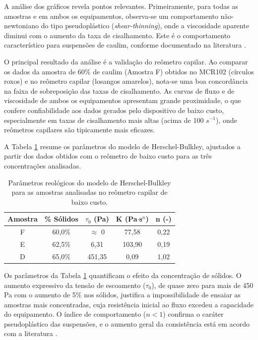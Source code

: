 \documentclass[article,12pt,oneside,a4paper,english,brazil,sumario=tradicional]{abntex2}
\begin{document}
A análise dos gráficos revela pontos relevantes. Primeiramente, para todas as amostras e em ambos os equipamentos, observa-se um comportamento não-newtoniano do tipo pseudoplástico (\textit{shear-thinning}), onde a viscosidade aparente diminui com o aumento da taxa de cisalhamento. Este é o comportamento característico para suspensões de caulim, conforme documentado na literatura .

O principal resultado da análise é a validação do reômetro capilar. Ao comparar os dados da amostra de 60\% de caulim (Amostra F) obtidos no MCR102 (círculos roxos) e no reômetro capilar (losangos amarelos), nota-se uma boa concordância na faixa de sobreposição das taxas de cisalhamento. As curvas de fluxo e de viscosidade de ambos os equipamentos apresentam grande proximidade, o que confere confiabilidade aos dados gerados pelo dispositivo de baixo custo, especialmente em taxas de cisalhamento mais altas (acima de 100 $s^{-1}$), onde reômetros capilares são tipicamente mais eficazes.

A Tabela \ref{tab:parametros_reologicos} resume os parâmetros do modelo de Herschel-Bulkley, ajustados a partir dos dados obtidos com o reômetro de baixo custo para as três concentrações analisadas.

\begin{table}[h!]
\centering
\caption{Parâmetros reológicos do modelo de Herschel-Bulkley para as amostras analisadas no reômetro capilar de baixo custo.}
\label{tab:parametros_reologicos}
\begin{tabular}{@{}ccccc@{}}
\toprule
\textbf{Amostra} & \textbf{\% Sólidos} & \textbf{$\tau_0$ (Pa)} & \textbf{K (Pa$\cdot$s$^n$)} & \textbf{n (-)} \\ \midrule
F & 60,0\% & $\approx$ 0 & 77,58 & 0,22 \\
E & 62,5\% & 6,31 & 103,90 & 0,19 \\
D & 65,0\% & 451,35 & 0,09 & 1,02 \\ \bottomrule
\end{tabular}
\end{table}

Os parâmetros da Tabela \ref{tab:parametros_reologicos} quantificam o efeito da concentração de sólidos. O aumento expressivo da tensão de escoamento ($\tau_0$), de quase zero para mais de 450 Pa com o aumento de 5\% nos sólidos, justifica a impossibilidade de ensaiar as amostras mais concentradas, cuja resistência inicial ao fluxo excedeu a capacidade do equipamento. O índice de comportamento ($n<1$) confirma o caráter pseudoplástico das suspensões, e o aumento geral da consistência está em acordo com a literatura .
\end{document}

